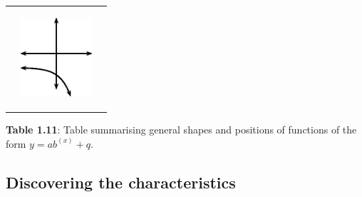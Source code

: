 \begin{center}
\begin{xtabular*}{\mytablewidth}[t]{|p{10\mystarwidth}|p{10\mystarwidth}|p{10\mystarwidth}|}
\begin{center}
\end{center}    
    &
\setcounter{subfigure}{0}
\label{m39348*id250608}
\begin{center}
\label{m39348*id250608!!!underscore!!!media}\label{m39348*id250608!!!underscore!!!printimage}\includegraphics[width=100px]{col11306.imgs/m39348_MG10C11_031.png} %
\vspace{2pt}
\vspace{.1in}
\end{center}    
\tabularnewline{}
\end{xtabular*}
\end{center}
\begin{center}{\small\bfseries Table 1.11}: Table summarising general shapes and positions of functions of the form $y=a{b}^{(x)}+q$.\end{center}
\par
\subsection*{Discovering the characteristics}

